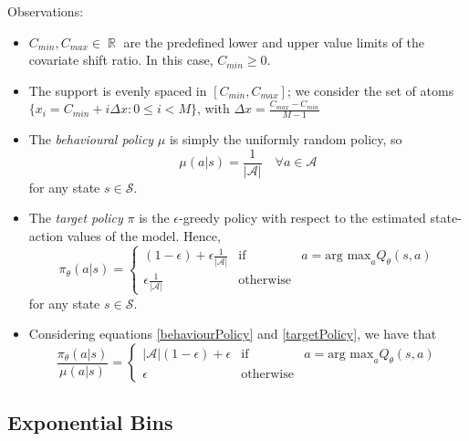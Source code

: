 \documentclass[12pt,a4paper,openright,twoside]{article}
\DeclareMathOperator*{\R}{\mathbb{R}}
\numberwithin{equation}{section}
\theoremstyle{definition}
\theoremstyle{remark}
\theoremstyle{plain}
\begin{document}
Observations:
\begin{itemize}
    \item $C_{min}, C_{max} \in \R$ are the predefined lower and upper value limits of the covariate shift ratio. In this case, $C_{min} \geq 0$.
    \item The support is evenly spaced in $[C_{min}, C_{max}]$; we consider the set of atoms $\{x_i = C_{min} + i \Delta x : 0 \leq i < M \}$, with $\Delta x = \frac{C_{max}-C_{min}}{M-1}$
    \item The \textit{behavioural policy} $\mu$ is simply the uniformly random policy, so 
    \begin{equation} \label{behaviourPolicy}
        \mu(a|s) = \frac{1}{|\mathcal{A}|} \quad \forall a \in \mathcal{A}
    \end{equation}
    for any state $s \in \mathcal{S}$.
    \item The \textit{target policy} $\pi$ is the $\epsilon$-greedy policy with respect to the estimated state-action values of the model. Hence,%
    \begin{equation} \label{targetPolicy}
        \pi_\theta (a|s) = 
        \left\{ 
            \begin{array}{lcc}
                (1-\epsilon)+\epsilon \frac{1}{|\mathcal{A}|} &   \text{if} & a = \text{arg max}_a Q_\theta(s,a) \\
                \epsilon \frac{1}{|\mathcal{A}|} &  \text{otherwise} &
            \end{array}
        \right. 
    \end{equation}
   for any state $s \in \mathcal{S}$.
   \item Considering equations \ref{behaviourPolicy} and \ref{targetPolicy}, we have that
   \begin{equation} \label{policyQuotient}
        \frac{\pi_\theta (a|s)}{\mu(a|s)} = 
        \left\{ 
            \begin{array}{lcc}
                |\mathcal{A}|(1-\epsilon)+\epsilon  &   \text{if} & a = \text{arg max}_a Q_\theta(s,a) \\
                \epsilon  &  \text{otherwise} &
            \end{array}
        \right. 
    \end{equation}
\end{itemize}


\subsection{Exponential Bins}
\end{document}
